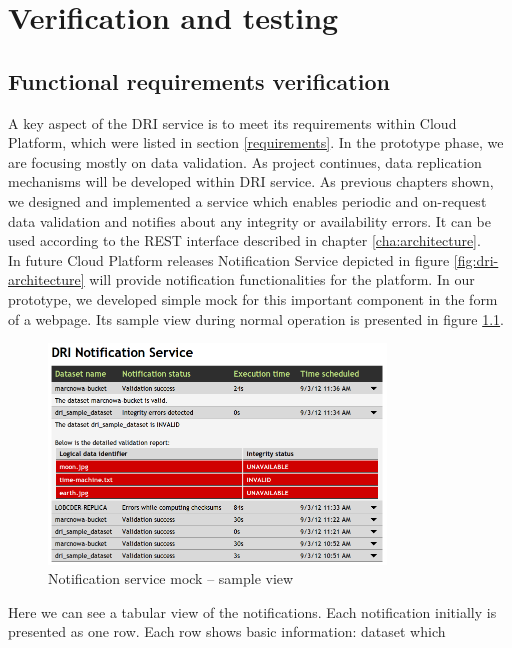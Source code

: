 \chapter{Verification and testing}
\label{cha:testing}

	\section{Functional requirements verification}
A key aspect of the DRI service is to meet its requirements within Cloud
Platform, which were listed in section \ref{requirements}. In the prototype
phase, we are focusing mostly on data validation. As project continues, data
replication mechanisms will be developed within DRI service. As previous
chapters shown, we designed and implemented a service which enables periodic
and on-request data validation and notifies about any integrity or availability
errors. It can be used according to the REST interface described in chapter
\ref{cha:architecture}.\\

In future Cloud Platform releases Notification Service depicted in figure
\ref{fig:dri-architecture} will provide notification functionalities for the
platform. In our prototype, we developed simple mock for this important
component in the form of a webpage. Its sample view during normal operation is
presented in figure \ref{fig:notification-service}.

\begin{figure}[h!]
	\centering
	\includegraphics[width=0.8\textwidth]{images/notification-service.png}
	\caption{Notification service mock -- sample view}
	\label{fig:notification-service}
\end{figure}

Here we can see a tabular view of the notifications. Each notification
initially is presented as one row. Each row shows basic information: dataset
which
 
